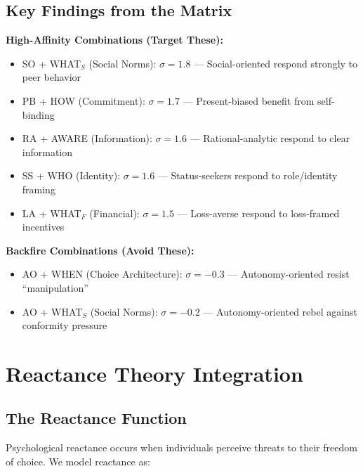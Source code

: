 \subsection{Key Findings from the Matrix}

\begin{tcolorbox}[colback=yellow!5!white, colframe=yellow!75!black,
    title=Critical Segment-Type Matches and Mismatches]

\textbf{High-Affinity Combinations (Target These):}
\begin{itemize}[nosep]
\item SO + WHAT$_S$ (Social Norms): $\sigma = 1.8$ --- Social-oriented respond strongly to peer behavior
\item PB + HOW (Commitment): $\sigma = 1.7$ --- Present-biased benefit from self-binding
\item RA + AWARE (Information): $\sigma = 1.6$ --- Rational-analytic respond to clear information
\item SS + WHO (Identity): $\sigma = 1.6$ --- Status-seekers respond to role/identity framing
\item LA + WHAT$_F$ (Financial): $\sigma = 1.5$ --- Loss-averse respond to loss-framed incentives
\end{itemize}

\textbf{Backfire Combinations (Avoid These):}
\begin{itemize}[nosep]
\item AO + WHEN (Choice Architecture): $\sigma = -0.3$ --- Autonomy-oriented resist ``manipulation''
\item AO + WHAT$_S$ (Social Norms): $\sigma = -0.2$ --- Autonomy-oriented rebel against conformity pressure
\end{itemize}

\end{tcolorbox}


\section{Reactance Theory Integration}
\label{sec:qq-reactance}

\subsection{The Reactance Function}

Psychological reactance occurs when individuals perceive threats to their freedom
of choice. We model reactance as:

